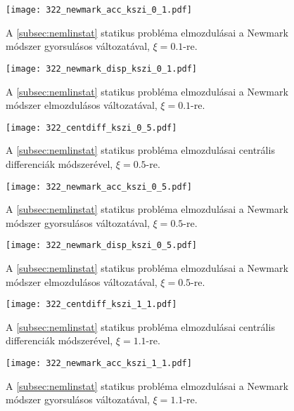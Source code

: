 \begin{figure}[p]
\centering
\texttt{[image: 322\_newmark\_acc\_kszi\_0\_1.pdf]}
\caption{A \ref{subsec:nemlinstat} statikus probléma elmozdulásai a Newmark módszer gyorsulásos változatával, $\xi = 0.1$-re.}
\label{fig:322_newmark_acc_0_1}
\end{figure}

\begin{figure}[h!]
\centering
\texttt{[image: 322\_newmark\_disp\_kszi\_0\_1.pdf]}
\caption{A \ref{subsec:nemlinstat} statikus probléma elmozdulásai a Newmark módszer elmozdulásos változatával, $\xi = 0.1$-re.}
\label{fig:322_newmark_disp_0_1}
\end{figure}

\begin{figure}[p]
\centering
\texttt{[image: 322\_centdiff\_kszi\_0\_5.pdf]}
\caption{A \ref{subsec:nemlinstat} statikus probléma elmozdulásai centrális differenciák módszerével, $\xi = 0.5$-re.}
\label{fig:322_centdiff_0_5}
\end{figure}

\begin{figure}[p]
\centering
\texttt{[image: 322\_newmark\_acc\_kszi\_0\_5.pdf]}
\caption{A \ref{subsec:nemlinstat} statikus probléma elmozdulásai a Newmark módszer gyorsulásos változatával, $\xi = 0.5$-re.}
\label{fig:322_newmark_acc_0_5}
\end{figure}

\begin{figure}[h!]
\centering
\texttt{[image: 322\_newmark\_disp\_kszi\_0\_5.pdf]}
\caption{A \ref{subsec:nemlinstat} statikus probléma elmozdulásai a Newmark módszer elmozdulásos változatával, $\xi = 0.5$-re.}
\label{fig:322_newmark_disp_0_5}
\end{figure}

\begin{figure}[p]
\centering
\texttt{[image: 322\_centdiff\_kszi\_1\_1.pdf]}
\caption{A \ref{subsec:nemlinstat} statikus probléma elmozdulásai centrális differenciák módszerével, $\xi = 1.1$-re.}
\label{fig:322_centdiff_1_1}
\end{figure}

\begin{figure}[p]
\centering
\texttt{[image: 322\_newmark\_acc\_kszi\_1\_1.pdf]}
\caption{A \ref{subsec:nemlinstat} statikus probléma elmozdulásai a Newmark módszer gyorsulásos változatával, $\xi = 1.1$-re.}
\label{fig:322_newmark_acc_1_1}
\end{figure}

